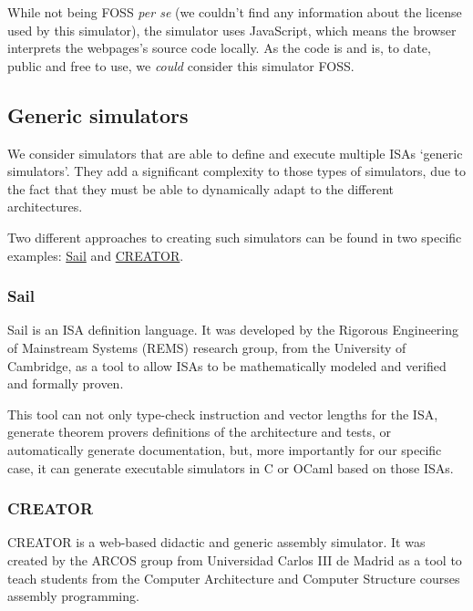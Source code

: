While not being \gls{FOSS} \textit{per se} (we couldn't find any information about the license used by this simulator), the simulator uses JavaScript, which means the browser interprets the webpages's source code locally. As the code is  and is, to date, public and free to use, we \textit{could} consider this simulator \gls{FOSS}.



\subsection{Generic simulators}\label{subsec:generic-assembly-simulators}
We consider simulators that are able to define and execute multiple \glspl{ISA} `generic simulators'. They add a significant complexity to those types of simulators, due to the fact that they must be able to dynamically adapt to the different architectures.

Two different approaches to creating such simulators can be found in two specific examples: \hyperref[subsubsec:sail]{Sail} and \hyperref[subsubsec:creator]{CREATOR}.


\subsubsection*{Sail}\label{subsubsec:sail}
Sail\supercite{sail} is an \gls{ISA} definition language. It was developed by the Rigorous Engineering of Mainstream Systems (REMS)\supercite{rems} research group, from the University of Cambridge, as a tool to allow \glspl{ISA} to be mathematically modeled and verified and formally proven\supercite{ArmstrongAlasdair2019IsfA}.

This tool can not only type-check instruction and vector lengths for the \gls{ISA}, generate \glspl{theorem prover} definitions of the architecture and tests, or automatically generate documentation, but, more importantly for our specific case, it can generate executable simulators in C or OCaml based on those \glspl{ISA}.


\subsubsection*{CREATOR}\label{subsubsec:creator}
CREATOR\supercite{creator} is a web-based didactic and generic \gls{assembly} simulator. It was created by the ARCOS group from Universidad Carlos III de Madrid as a tool to teach students from the Computer Architecture and Computer Structure courses \gls{assembly} programming\supercite{creatorZenodo}.

